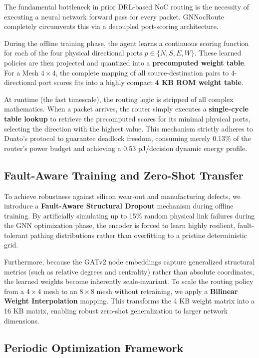 The fundamental bottleneck in prior DRL-based NoC routing is the necessity of executing a neural network forward pass for every packet. GNNocRoute completely circumvents this via a decoupled port-scoring architecture.

During the offline training phase, the agent learns a continuous scoring function for each of the four physical directional ports $p \in \{N, S, E, W\}$. These learned policies are then projected and quantized into a \textbf{precomputed weight table}. For a Mesh $4\times4$, the complete mapping of all source-destination pairs to $4$-directional port scores fits into a highly compact \textbf{4 KB ROM weight table}.

At runtime (the fast timescale), the routing logic is stripped of all complex mathematics. When a packet arrives, the router simply executes a \textbf{single-cycle table lookup} to retrieve the precomputed scores for its minimal physical ports, selecting the direction with the highest value. This mechanism strictly adheres to Duato's protocol to guarantee deadlock freedom, consuming merely 0.13\% of the router's power budget and achieving a 0.53 pJ/decision dynamic energy profile.

\subsection{Fault-Aware Training and Zero-Shot Transfer}

To achieve robustness against silicon wear-out and manufacturing defects, we introduce a \textbf{Fault-Aware Structural Dropout} mechanism during offline training. By artificially simulating up to 15\% random physical link failures during the GNN optimization phase, the encoder is forced to learn highly resilient, fault-tolerant pathing distributions rather than overfitting to a pristine deterministic grid.

Furthermore, because the GATv2 node embeddings capture generalized structural metrics (such as relative degrees and centrality) rather than absolute coordinates, the learned weights become inherently scale-invariant. To scale the routing policy from a $4\times4$ mesh to an $8\times8$ mesh without retraining, we apply a \textbf{Bilinear Weight Interpolation} mapping. This transforms the 4 KB weight matrix into a 16 KB matrix, enabling robust zero-shot generalization to larger network dimensions.

\subsection{Periodic Optimization Framework}

